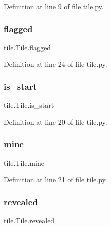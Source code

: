 Definition at line 9 of file tile.\+py.

\mbox{\label{classtile_1_1_tile_aa67ee8ccb2215eae98063593792e341c}} 
\subsubsection{\texorpdfstring{flagged}{flagged}}
{\footnotesize\ttfamily tile.\+Tile.\+flagged}



Definition at line 24 of file tile.\+py.

\mbox{\label{classtile_1_1_tile_ab4f8de0b5af2f9a0b27224d725e8b5a7}} 
\subsubsection{\texorpdfstring{is\_start}{is\_start}}
{\footnotesize\ttfamily tile.\+Tile.\+is\+\_\+start}



Definition at line 20 of file tile.\+py.

\mbox{\label{classtile_1_1_tile_ab29c964ec3ffe2e99aa557bb8d3a9982}} 
\subsubsection{\texorpdfstring{mine}{mine}}
{\footnotesize\ttfamily tile.\+Tile.\+mine}



Definition at line 21 of file tile.\+py.

\mbox{\label{classtile_1_1_tile_a5757ce164d1a98a1a001e81d78243356}} 
\subsubsection{\texorpdfstring{revealed}{revealed}}
{\footnotesize\ttfamily tile.\+Tile.\+revealed}



